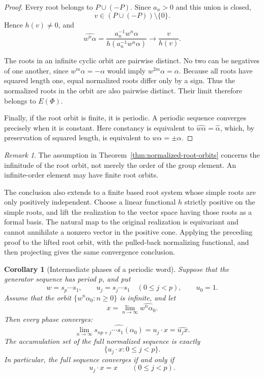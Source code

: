 \documentclass[11pt,reqno]{amsart}
\theoremstyle{plain}
\newtheorem{corollary}[theorem]{Corollary}
\theoremstyle{definition}
\theoremstyle{remark}
\newtheorem{remark}[theorem]{Remark}
\numberwithin{equation}{section}
\begin{document}
\begin{proof}
Every root belongs to $P\cup(-P)$.
Since $a_n>0$ and this union is closed,
\[
v\in(P\cup(-P))\setminus\{0\}.
\]
Hence $h(v)\neq0$, and
\[
\widehat{w^n\alpha}
=
\frac{a_n^{-1}w^n\alpha}
     {h(a_n^{-1}w^n\alpha)}
\longrightarrow
\frac{v}{h(v)}.
\]

The roots in an infinite cyclic orbit are pairwise distinct.
No two can be negatives of one another, since
$w^m\alpha=-\alpha$ would imply $w^{2m}\alpha=\alpha$.
Because all roots have squared length one, equal normalized
roots differ only by a sign.
Thus the normalized roots in the orbit are also pairwise
distinct.
Their limit therefore belongs to $E(\Phi)$.

Finally, if the root orbit is finite, it is periodic.
A periodic sequence converges precisely when it is constant.
Here constancy is equivalent to
$\widehat{w\alpha}=\widehat{\alpha}$, which, by preservation
of squared length, is equivalent to $w\alpha=\pm\alpha$.
\end{proof}

\begin{remark}
The assumption in
Theorem~\ref{thm:normalized-root-orbits}
concerns the infinitude of the root orbit, not merely
the order of the group element.
An infinite-order element may have finite root orbits.

The conclusion also extends to a finite based root system
whose simple roots are only positively independent.
Choose a linear functional $h$ strictly positive on the
simple roots, and lift the realization to the vector space
having those roots as a formal basis.
The natural map to the original realization is equivariant
and cannot annihilate a nonzero vector in the positive cone.
Applying the preceding proof to the lifted root orbit,
with the pulled-back normalizing functional, and then
projecting gives the same convergence conclusion.
\end{remark}

\begin{corollary}[Intermediate phases of a periodic word]
\label{cor:periodic-root-phases}
Suppose that the generator sequence has period $p$, and put
\[
w=s_p\cdots s_1,
\qquad
u_j=s_j\cdots s_1
\quad(0\leq j<p),
\qquad
u_0=1.
\]
Assume that the orbit $\{w^n\alpha_0:n\geq0\}$ is infinite,
and let
\[
x=\lim_{n\to\infty}\widehat{w^n\alpha_0}.
\]
Then every phase converges:
\[
\lim_{n\to\infty}
\widehat{s_{np+j}\cdots s_1(\alpha_0)}
=
u_j\cdot x
=
\widehat{u_jx}.
\]
The accumulation set of the full normalized sequence is
exactly
\[
\{u_j\cdot x:0\leq j<p\}.
\]
In particular, the full sequence converges if and only if
\[
u_j\cdot x=x
\qquad(0\leq j<p).
\]
\end{corollary}
\end{document}
